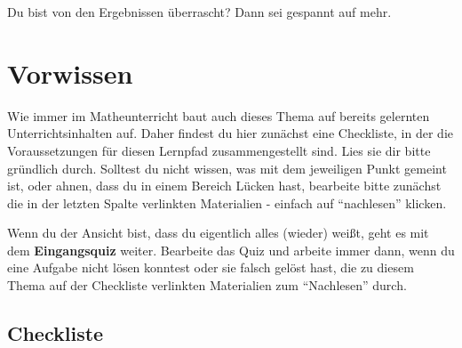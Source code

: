 \documentclass[
  ngerman,
]{book}
\begin{document}
Du bist von den Ergebnissen überrascht? Dann sei gespannt auf mehr.

\hypertarget{vorwissen}{%
\chapter{Vorwissen}\label{vorwissen}}

Wie immer im Matheunterricht baut auch dieses Thema auf bereits gelernten Unterrichtsinhalten auf. Daher findest du hier zunächst eine Checkliste, in der die Voraussetzungen für diesen Lernpfad zusammengestellt sind. Lies sie dir bitte gründlich durch. Solltest du nicht wissen, was mit dem jeweiligen Punkt gemeint ist, oder ahnen, dass du in einem Bereich Lücken hast, bearbeite bitte zunächst die in der letzten Spalte verlinkten Materialien - einfach auf ``nachlesen'' klicken.

Wenn du der Ansicht bist, dass du eigentlich alles (wieder) weißt, geht es mit dem \textbf{Eingangsquiz} weiter. Bearbeite das Quiz und arbeite immer dann, wenn du eine Aufgabe nicht lösen konntest oder sie falsch gelöst hast, die zu diesem Thema auf der Checkliste verlinkten Materialien zum ``Nachlesen'' durch.

\hypertarget{checkliste}{%
\section{Checkliste}\label{checkliste}}
\end{document}
